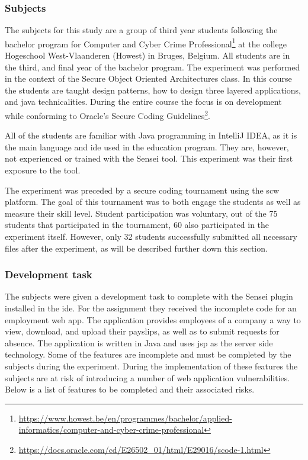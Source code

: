 \subsubsection{Subjects}
The subjects for this study are a group of third year students following the bachelor program for Computer and Cyber Crime Professional\footnote{\url{https://www.howest.be/en/programmes/bachelor/applied-informatics/computer-and-cyber-crime-professional}} at the college Hogeschool West-Vlaanderen (Howest) in Bruges, Belgium.
All students are in the third, and final year of the bachelor program.
The experiment was performed in the context of the Secure Object Oriented Architectures class.
In this course the students are taught design patterns, how to design three layered applications, and java technicalities.
During the entire course the focus is on development while conforming to Oracle's Secure Coding Guidelines\footnote{\url{https://docs.oracle.com/cd/E26502\_01/html/E29016/scode-1.html}}.

All of the students are familiar with Java programming in IntelliJ IDEA, as it is the main language and \gls{ide} used in the education program.
They are, however, not experienced or trained with the Sensei tool.
This experiment was their first exposure to the tool. 

The experiment was preceded by a secure coding tournament using the \gls{scw} platform.
The goal of this tournament was to both engage the students as well as measure their skill level.
Student participation was voluntary, out of the 75 students that participated in the tournament, 60 also participated in the experiment itself.
However, only 32 students successfully submitted all necessary files after the experiment, as will be described further down this section.

\subsubsection{Development task}
\label{sec:task}
The subjects were given a development task to complete with the Sensei plugin installed in the \gls{ide}.
For the assignment they received the incomplete code for an employment web app.
The application provides employees of a company a way to view, download, and upload their payslips, as well as to submit requests for absence.
The application is written in Java and uses \gls{jsp} as the server side technology.
Some of the features are incomplete and must be completed by the subjects during the experiment.
During the implementation of these features the subjects are at risk of introducing a number of web application vulnerabilities.
Below is a list of features to be completed and their associated risks.

